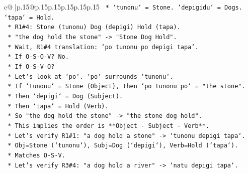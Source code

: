 \documentclass{article}
\begin{document}
{\begin{supertabular}{c@{$\;$}|p{.15\linewidth}@{}p{.15\linewidth}p{.15\linewidth}p{.15\linewidth}p{.15\linewidth}p{.15\linewidth}}
{{{\texttt{                                                                *   `tunonu` = Stone. `depigidu` = Dogs. `tapa` = Hold.} \\
\texttt{                                                            *   R1\#4: Stone (tunonu) Dog (depigi) Hold (tapa).} \\
\texttt{                                                                *   "the dog hold the stone" {-}> "Stone Dog Hold".} \\
\texttt{                                                                *   Wait, R1\#4 translation: `po tunonu po depigi tapa`.} \\
\texttt{                                                                *   If O{-}S{-}O{-}V? No.} \\
\texttt{                                                                *   If O{-}S{-}V{-}O?} \\
\texttt{                                                                *   Let's look at `po`. `po` surrounds `tunonu`.} \\
\texttt{                                                                *   If `tunonu` = Stone (Object), then `po tunonu po` = "the stone".} \\
\texttt{                                                                *   Then `depigi` = Dog (Subject).} \\
\texttt{                                                                *   Then `tapa` = Hold (Verb).} \\
\texttt{                                                                *   So "the dog hold the stone" {-}> "the stone dog hold".} \\
\texttt{                                                                *   This implies the order is **Object {-} Subject {-} Verb**.} \\
\texttt{                                                                *   Let's verify R1\#1: "a dog hold a stone" {-}> `tunonu depigi tapa`.} \\
\texttt{                                                                    *   Obj=Stone (`tunonu`), Subj=Dog (`depigi`), Verb=Hold (`tapa`).} \\
\texttt{                                                                    *   Matches O{-}S{-}V.} \\
\texttt{                                                                *   Let's verify R3\#4: "a dog hold a river" {-}> `natu depigi tapa`.} \\
}}}
\end{supertabular}}
\end{document}
